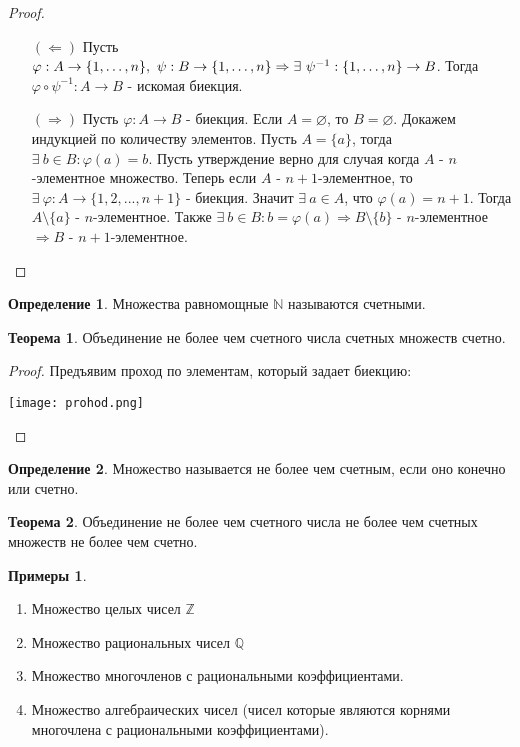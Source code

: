 \documentclass[a4paper, 12pt]{article}
\newcommand{\Z}{\mathbb{Z}}
\newcommand{\N}{\mathbb{N}}
\newcommand{\Q}{\mathbb{Q}}
\renewcommand{\phi}{\varphi}
\renewcommand{\emptyset}{\varnothing}
\newcommand\tab[1][.5cm]{\hspace*{#1}}
\theoremstyle{definition}
\newtheorem*{definition}{Определение}
\newtheorem*{theorem}{Теорема}
\newtheorem*{examples}{Примеры}
\begin{document}
        \begin{proof}
            \begin{itemize}
                \item[$(\Leftarrow)$] Пусть $\phi:A\to \{1,\dots, n\}, \ \psi:B\to \{1,\dots, n\}\\
                \Rightarrow \exists \ \psi^{-1}:\{1,\dots, n\}\to B$. Тогда $\phi \circ \psi^{-1}:A\to B$ - искомая биекция.
                \item[$(\Rightarrow)$] Пусть $\phi:A\to B$ - биекция. Если $A=\emptyset$, то $B=\emptyset$. Докажем индукцией по количеству элементов. Пусть $A=\{a\}$, тогда $\exists \ b\in B: \phi(a)=b$. Пусть утверждение верно для случая когда $A$ - $n$-элементное множество. Теперь если $A$ - $n+1$-элементное, то $\exists \ \phi:A\to \{1,2,...,n+1\}$ - биекция. Значит $\exists \ a\in A$, что $\phi(a)=n+1$. Тогда $A\setminus\{a\}$ - $n$-элементное. Также $\exists \ b\in B: b=\phi(a) \Rightarrow B\setminus\{b\}$ - $n$-элементное $\Rightarrow  B$ - $n+1$-элементное.
            \end{itemize}
        \end{proof}
        \begin{definition}
            Множества равномощные $\N$ называются счетными.
        \end{definition}
        \begin{theorem}
            Объединение не более чем счетного числа счетных множеств счетно.
        \end{theorem}
        \begin{proof}
            Предъявим проход по элементам, который задает биекцию:
            \begin{center}
                \texttt{[image: prohod.png]}
            \end{center}
        \end{proof}
        \begin{definition}
            Множество называется не более чем счетным, если оно конечно или счетно.
        \end{definition}
        \begin{theorem}
            Объединение не более чем счетного числа не более чем счетных множеств не более чем счетно.
        \end{theorem} 
        \begin{examples}
            \begin{enumerate}\tab
                \item Множество целых чисел $\Z$
                \item Множество рациональных чисел $\Q$
                \item Множество многочленов с рациональными коэффициентами.
                \item Множество алгебраических чисел (чисел которые являются корнями многочлена с рациональными коэффициентами).
            \end{enumerate}
        \end{examples}
\end{document}
